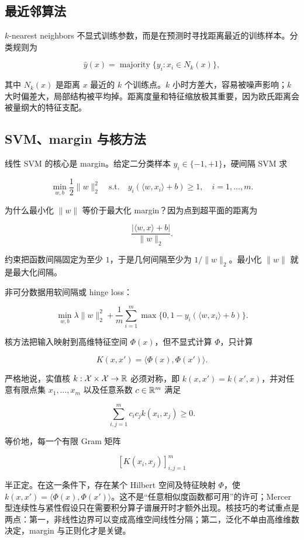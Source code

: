 \subsection{最近邻算法}

\(k\)-nearest neighbors 不显式训练参数，而是在预测时寻找距离最近的训练样本。分类规则为

\[
  \hat y(x)
  =
  \operatorname{majority}
  \{y_i:x_i\in N_k(x)\},
\]

其中 \(N_k(x)\) 是距离 \(x\) 最近的 \(k\) 个训练点。\(k\) 小时方差大，容易被噪声影响；\(k\) 大时偏差大，局部结构被平均掉。距离度量和特征缩放极其重要，因为欧氏距离会被量纲大的特征支配。

\subsection{SVM、margin 与核方法}


线性 SVM 的核心是 margin。给定二分类样本 \(y_i\in\{-1,+1\}\)，硬间隔 SVM 求

\[
  \min_{w,b}\frac12\|w\|_2^2
  \quad
  \text{s.t.}
  \quad
  y_i(\langle w,x_i\rangle+b)\ge 1,\quad i=1,\ldots,m.
\]

为什么最小化 \(\|w\|\) 等价于最大化 margin？因为点到超平面的距离为

\[
  \frac{|\langle w,x\rangle+b|}{\|w\|_2}.
\]

约束把函数间隔固定为至少 \(1\)，于是几何间隔至少为 \(1/\|w\|_2\)。最小化 \(\|w\|\) 就是最大化间隔。

非可分数据用软间隔或 hinge loss：

\[
  \min_{w,b}
  \lambda\|w\|_2^2
  +
  \frac1m
  \sum_{i=1}^{m}
  \max\{0,1-y_i(\langle w,x_i\rangle+b)\}.
\]

核方法把输入映射到高维特征空间 \(\Phi(x)\)，但不显式计算 \(\Phi\)，只计算

\[
  K(x,x')=\langle \Phi(x),\Phi(x')\rangle.
\]

严格地说，实值核 \(k:\mathcal{X}\times\mathcal{X}\to\mathbb{R}\) 必须对称，即 \(k(x,x')=k(x',x)\)，并对任意有限点集 \(x_1,\ldots,x_m\) 以及任意系数 \(c\in\mathbb{R}^m\) 满足

\[
  \sum_{i,j=1}^{m}c_i c_j k(x_i,x_j)\ge 0.
\]

等价地，每一个有限 Gram 矩阵

\[
  [K(x_i,x_j)]_{i,j=1}^{m}
\]

半正定。在这一条件下，存在某个 Hilbert 空间及特征映射 \(\Phi\)，使 \(k(x,x')=\langle\Phi(x),\Phi(x')\rangle\)。这不是“任意相似度函数都可用”的许可；Mercer 型连续性与紧性假设只在需要积分算子谱展开时才额外出现。核技巧的考试重点是两点：第一，非线性边界可以变成高维空间线性分隔；第二，泛化不单由高维维数决定，margin 与正则化才是关键。

